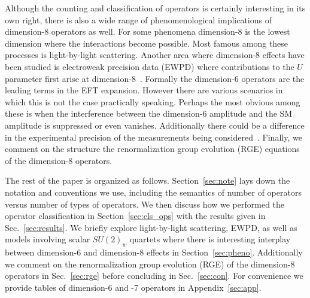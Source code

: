 Although the counting and classification of operators is certainly interesting in its own right, there is also a wide range of phenomenological implications of dimension-8 operators as well.
For some phenomena dimension-8 is the lowest dimension where the interactions become possible.
Most famous among these processes is light-by-light scattering.
Another area where dimension-8 effects have been studied is electroweak precision data (EWPD) where contributions to the $U$ parameter first arise at dimension-8~\cite{Grinstein:1991cd}.
Formally the dimension-6 operators are the leading terms in the EFT expansion.
However there are various scenarios in which this is not the case practically speaking.
Perhaps the most obvious among these is when the interference between the dimension-6 amplitude and the SM amplitude is suppressed or even vanishes.
Additionally there could be a difference in the experimental precision of the measurements being considered~\cite{Dawson:2017vgm}.
Finally, we comment on the structure the renormalization group evolution (RGE) equations of the dimension-8 operators. 

The rest of the paper is organized as follows.
Section~\ref{sec:note} lays down the notation and conventions we use, including the semantics of number of operators versus number of types of operators.
We then discuss how we performed the operator classification in Section~\ref{sec:cls_ops} with the results given in Sec.~\ref{sec:results}.
We briefly explore light-by-light scattering, EWPD, as well as models involving scalar $SU(2)_w$ quartets where there is interesting interplay between dimension-6 and dimension-8 effects in Section~\ref{sec:pheno}.
Additionally we comment on the renormalization group evolution (RGE) of the dimension-8 operators in Sec.~\ref{sec:rge} before concluding in Sec.~\ref{sec:con}.
For convenience we provide tables of dimension-6 and -7 operators in Appendix~\ref{sec:app}.